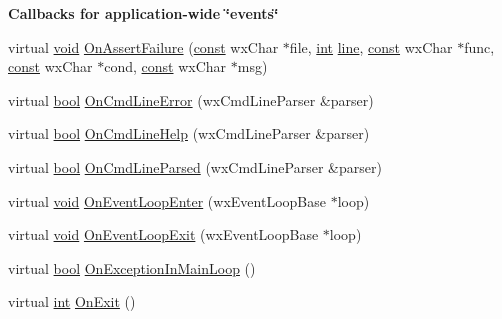 \begin{Indent}{\bf Callbacks for application-\/wide \char`\"{}events\char`\"{}}\par
\begin{DoxyCompactItemize}
\item 
virtual \hyperlink{sound_8c_ae35f5844602719cf66324f4de2a658b3}{void} \hyperlink{classwx_app_console_a5f91d78bbfe3c9ef28e8e3c8fdf29989}{On\+Assert\+Failure} (\hyperlink{getopt1_8c_a2c212835823e3c54a8ab6d95c652660e}{const} wx\+Char $\ast$file, \hyperlink{xmltok_8h_a5a0d4a5641ce434f1d23533f2b2e6653}{int} \hyperlink{seqread_8c_aad9ebcdde542d8b2075615388ff15a9c}{line}, \hyperlink{getopt1_8c_a2c212835823e3c54a8ab6d95c652660e}{const} wx\+Char $\ast$func, \hyperlink{getopt1_8c_a2c212835823e3c54a8ab6d95c652660e}{const} wx\+Char $\ast$cond, \hyperlink{getopt1_8c_a2c212835823e3c54a8ab6d95c652660e}{const} wx\+Char $\ast$msg)
\item 
virtual \hyperlink{mac_2config_2i386_2lib-src_2libsoxr_2soxr-config_8h_abb452686968e48b67397da5f97445f5b}{bool} \hyperlink{classwx_app_console_a1c8bf26b12a280fd03911caac70e3144}{On\+Cmd\+Line\+Error} (wx\+Cmd\+Line\+Parser \&parser)
\item 
virtual \hyperlink{mac_2config_2i386_2lib-src_2libsoxr_2soxr-config_8h_abb452686968e48b67397da5f97445f5b}{bool} \hyperlink{classwx_app_console_a1d9ee414483ec30c03acde70d2dc1e3b}{On\+Cmd\+Line\+Help} (wx\+Cmd\+Line\+Parser \&parser)
\item 
virtual \hyperlink{mac_2config_2i386_2lib-src_2libsoxr_2soxr-config_8h_abb452686968e48b67397da5f97445f5b}{bool} \hyperlink{classwx_app_console_aa6a309dbbaec2f75720df2d5743cf0e0}{On\+Cmd\+Line\+Parsed} (wx\+Cmd\+Line\+Parser \&parser)
\item 
virtual \hyperlink{sound_8c_ae35f5844602719cf66324f4de2a658b3}{void} \hyperlink{classwx_app_console_aa116701a3bd7700fe6979117e53ae999}{On\+Event\+Loop\+Enter} (wx\+Event\+Loop\+Base $\ast$loop)
\item 
virtual \hyperlink{sound_8c_ae35f5844602719cf66324f4de2a658b3}{void} \hyperlink{classwx_app_console_a8f94f02a752bb416e99161710637d8f3}{On\+Event\+Loop\+Exit} (wx\+Event\+Loop\+Base $\ast$loop)
\item 
virtual \hyperlink{mac_2config_2i386_2lib-src_2libsoxr_2soxr-config_8h_abb452686968e48b67397da5f97445f5b}{bool} \hyperlink{classwx_app_console_aca806b41cf74fd6166e4fb2e2708e9bf}{On\+Exception\+In\+Main\+Loop} ()
\item 
virtual \hyperlink{xmltok_8h_a5a0d4a5641ce434f1d23533f2b2e6653}{int} \hyperlink{classwx_app_console_a5ee60051c92b0b2933258799626a0485}{On\+Exit} ()

\end{DoxyCompactItemize}
\end{Indent}
